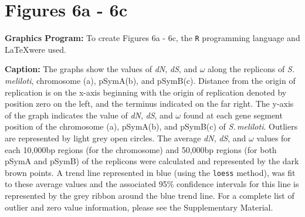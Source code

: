 \documentclass[11pt]{article}
\newcommand{\smel}{\textit{S.\,meliloti}\xspace}
\newcommand{\pa}{pSymA\xspace}
\newcommand{\pb}{pSymB\xspace}
\newcommand{\dn}{\textit{dN}\xspace}
\newcommand{\ds}{\textit{dS}\xspace}
\begin{document}
\section*{Figures 6a - 6c}
\textbf{Graphics Program:}
To create Figures 6a - 6c, the \texttt{R} programming language and \LaTeX were used.

\textbf{Caption:} The graphs show the values of \dn, \ds, and $\omega$ along the replicons of \smel, chromosome (a), \pa (b), and \pb (c). Distance from the origin of replication is on the x-axis beginning with the origin of replication denoted by position zero on the left, and the terminus indicated on the far right. The y-axis of the graph indicates the value of \dn, \ds, and $\omega$ found at each gene segment position of the chromosome (a), \pa (b), and \pb (c) of \smel. Outliers are represented by light grey open circles. The average \dn, \ds, and $\omega$ values for each 10,000bp regions (for the chromosome) and 50,000bp regions (for both \pa and \pb) of the replicons were calculated and represented by the dark brown points. A trend line represented in blue (using the \texttt{loess} method), was fit to these average values and the associated 95\% confidence intervals for this line is represented by the grey ribbon around the blue trend line. For a complete list of outlier and zero value information, please see the Supplementary Material.


	
\end{document}

